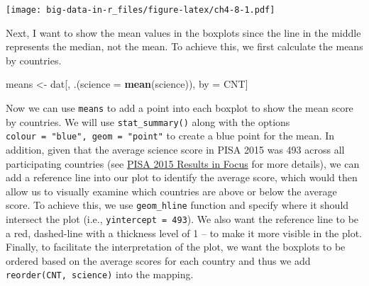 \documentclass[]{book}
\newenvironment{Shaded}{\begin{snugshade}}{\end{snugshade}}
\newcommand{\DataTypeTok}[1]{\textcolor[rgb]{0.13,0.29,0.53}{#1}}
\newcommand{\KeywordTok}[1]{\textcolor[rgb]{0.13,0.29,0.53}{\textbf{#1}}}
\newcommand{\NormalTok}[1]{#1}
\newcommand{\StringTok}[1]{\textcolor[rgb]{0.31,0.60,0.02}{#1}}
\begin{document}
\texttt{[image: big-data-in-r\_files/figure-latex/ch4-8-1.pdf]}

Next, I want to show the mean values in the boxplots since the line in the middle represents the median, not the mean. To achieve this, we first calculate the means by countries.

\begin{Shaded}
\begin{Highlighting}[]
\NormalTok{means <-}\StringTok{ }\NormalTok{dat[,}
\NormalTok{             .(}\DataTypeTok{science =} \KeywordTok{mean}\NormalTok{(science)),}
\NormalTok{             by =}\StringTok{ }\NormalTok{CNT]}
\end{Highlighting}
\end{Shaded}

Now we can use \texttt{means} to add a point into each boxplot to show the mean score by countries. We will use \texttt{stat\_summary()} along with the options \texttt{colour\ =\ "blue",\ geom\ =\ "point"} to create a blue point for the mean. In addition, given that the average science score in PISA 2015 was 493 across all participating countries (see \href{https://www.oecd.org/pisa/pisa-2015-results-in-focus.pdf}{PISA 2015 Results in Focus} for more details), we can add a reference line into our plot to identify the average score, which would then allow us to visually examine which countries are above or below the average score. To achieve this, we use \texttt{geom\_hline} function and specify where it should intersect the plot (i.e., \texttt{yintercept\ =\ 493}). We also want the reference line to be a red, dashed-line with a thickness level of 1 -- to make it more visible in the plot. Finally, to facilitate the interpretation of the plot, we want the boxplots to be ordered based on the average scores for each country and thus we add \texttt{reorder(CNT,\ science)} into the mapping.
\end{document}
